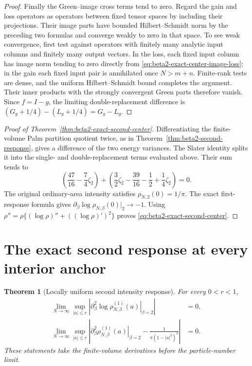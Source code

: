 \documentclass[11pt,a4paper]{article}
\numberwithin{equation}{section}
\newtheorem{theorem}{Theorem}[section]
\theoremstyle{definition}
\theoremstyle{remark}
\begin{document}
\begin{proof}
Finally the Green--image cross terms tend to zero.  Regard the
gain and loss operators as operators between fixed tensor spaces
by including their projections.  Their image parts have bounded
Hilbert--Schmidt norm by the preceding two formulas and converge
weakly to zero in that space.  To see weak convergence, first test
against operators with finitely many analytic input columns and
finitely many output vectors.  In the loss, each fixed input column
has image norm tending to zero directly from
\eqref{eq:beta2-exact-center-image-loss}; in the gain each fixed
input pair is annihilated once $N>m+n$.  Finite-rank tests are
dense, and the uniform Hilbert--Schmidt bound completes the argument.
Their inner products with the strongly convergent Green parts
therefore vanish.  Since $f=I-g$, the limiting double-replacement
difference is $(G_g+1/4)-(L_g+1/4)=G_g-L_g$.
\end{proof}

\begin{proof}[Proof of Theorem~\ref{thm:beta2-exact-second-center}]
Differentiating the finite-volume Palm partition quotient twice,
as in Theorem~\ref{thm:beta2-second-response}, gives a difference
of the two energy variances.  The Slater identity splits it into
the single- and double-replacement terms evaluated above.  Their
sum tends to
\[
 \left(\frac{47}{16}-\frac74\zeta_2\right)
 +\left(\frac32\zeta_2-\frac{39}{16}
                      -\frac12+\frac14\zeta_2\right)=0.
\]
The original ordinary-area intensity satisfies $\rho_{N,2}(0)=1/\pi$.
The exact first-response formula gives
$\partial_\beta\log\rho_{N,\beta}(0)|_2\to-1$.
Using $\rho''=\rho\{(\log\rho)''+((\log\rho)')^2\}$ proves
\eqref{eq:beta2-exact-second-center}.
\end{proof}


\section{The exact second response at every interior anchor}
\label{sec:beta2-exact-second-all-anchors}

\begin{theorem}[Locally uniform second intensity response]
\label{thm:beta2-exact-second-all-anchors}
For every $0<r<1$,
\begin{align}
 \lim_{N\to\infty}\sup_{|a|\le r}
 \left|\left.\partial_\beta^2\log\rho_{N,\beta}^{(1)}(a)
                                      \right|_{\beta=2}\right|&=0,
 \label{eq:beta2-exact-second-all-log}\\
 \lim_{N\to\infty}\sup_{|a|\le r}
 \left|\left.\partial_\beta^2\rho_{N,\beta}^{(1)}(a)
 \right|_{\beta=2}-\frac1{\pi(1-|a|^2)^2}\right|&=0.
 \label{eq:beta2-exact-second-all-intensity}
\end{align}
These statements take the finite-volume derivatives before the
particle-number limit.
\end{theorem}
\end{document}
